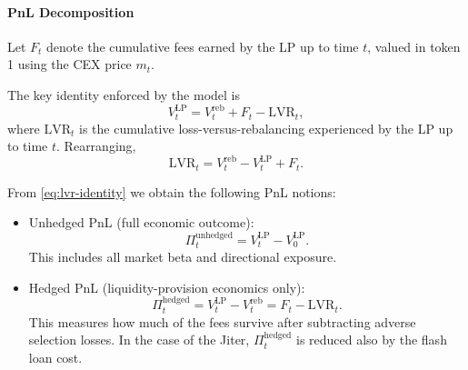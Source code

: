 \documentclass[11pt]{article}
\begin{document}


\paragraph{PnL Decomposition}
\label{paragraph:PnL_decomposition}
Let $F_t$ denote the cumulative fees earned by the LP up to time $t$, valued in token 1
using the CEX price $m_t$.

The key identity enforced by the model is
\begin{equation}
  V_t^{\mathrm{LP}} = V_t^{\mathrm{reb}} + F_t - \mathrm{LVR}_t,
  \label{eq:lvr-identity}
\end{equation}
where $\mathrm{LVR}_t$ is the cumulative loss-versus-rebalancing experienced by the LP
up to time $t$. Rearranging,
\begin{equation}
  \mathrm{LVR}_t = V_t^{\mathrm{reb}} - V_t^{\mathrm{LP}} + F_t.
\end{equation}

From \eqref{eq:lvr-identity} we obtain the following PnL notions:
\begin{itemize}[leftmargin=*]
  \item Unhedged PnL (full economic outcome):
        \begin{equation}
          \Pi_t^{\mathrm{unhedged}}
          = V_t^{\mathrm{LP}} - V_0^{\mathrm{LP}}.
        \end{equation}
        This includes all market beta and directional exposure.
  \item Hedged PnL (liquidity-provision economics only):
        \begin{equation}
          \Pi_t^{\mathrm{hedged}}
          = V_t^{\mathrm{LP}} - V_t^{\mathrm{reb}}
          = F_t - \mathrm{LVR}_t.
          \label{eq:hedged-pnl}
        \end{equation}
        This measures how much of the fees survive after subtracting adverse selection losses. In the case of the Jiter, $\Pi_t^{\mathrm{hedged}}$ is reduced also by the flash loan cost. 
\end{itemize}
\end{document}

